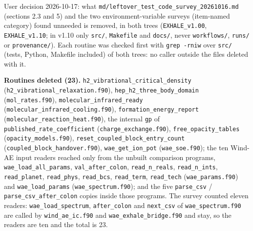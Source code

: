\documentclass[english,a4paper]{my_memo}
\begin{document}
User decision 2026-10-17: what \texttt{md/leftover\_test\_code\_survey\_20261016.md} (sections 2.3 and 5) and the two environment-variable surveys (item-named category) found unneeded is removed, in both trees (\texttt{EXHALE\_v1.00}, \texttt{EXHALE\_v1.10}; in v1.10 only \texttt{src/}, \texttt{Makefile} and \texttt{docs/}, never \texttt{workflows/}, \texttt{runs/} or \texttt{provenance/}). Each routine was checked first with \texttt{grep\ -rniw} over \texttt{src/} (tests, Python, Makefile included) of both trees: no caller outside the files deleted with it.

\textbf{Routines deleted (23).} \texttt{h2\_vibrational\_critical\_density} (\texttt{h2\_vibrational\_relaxation.f90}), \texttt{hep\_h2\_three\_body\_domain} (\texttt{mol\_rates.f90}), \texttt{molecular\_infrared\_ready} (\texttt{molecular\_infrared\_cooling.f90}), \texttt{formation\_energy\_report} (\texttt{molecular\_reaction\_heat.f90}), the internal \texttt{gp} of \texttt{published\_rate\_coefficient} (\texttt{charge\_exchange.f90}), \texttt{free\_opacity\_tables} (\texttt{opacity\_models.f90}), \texttt{reset\_coupled\_block\_entry\_count} (\texttt{coupled\_block\_handover.f90}), \texttt{wae\_get\_ion\_pot} (\texttt{wae\_soe.f90}); the ten Wind-AE input readers reached only from the unbuilt comparison programs, \texttt{wae\_load\_all\_params}, \texttt{val\_after\_colon}, \texttt{read\_n\_reals}, \texttt{read\_n\_ints}, \texttt{read\_planet}, \texttt{read\_phys}, \texttt{read\_bcs}, \texttt{read\_term}, \texttt{read\_tech} (\texttt{wae\_params.f90}) and \texttt{wae\_load\_params} (\texttt{wae\_spectrum.f90}); and the five \texttt{parse\_csv} / \texttt{parse\_csv\_after\_colon} copies inside those programs. The survey counted eleven readers: \texttt{wae\_load\_spectrum}, \texttt{after\_colon} and \texttt{next\_csv} of \texttt{wae\_spectrum.f90} are called by \texttt{wind\_ae\_ic.f90} and \texttt{wae\_exhale\_bridge.f90} and stay, so the readers are ten and the total is 23.
\end{document}
